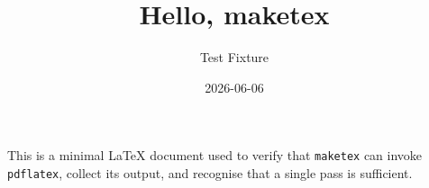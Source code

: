 \documentclass{article}
\title{Hello, maketex}
\author{Test Fixture}
\date{2026-06-06}
\begin{document}
\maketitle

This is a minimal \LaTeX{} document used to verify that \texttt{maketex}
can invoke \texttt{pdflatex}, collect its output, and recognise that a
single pass is sufficient.
\end{document}
